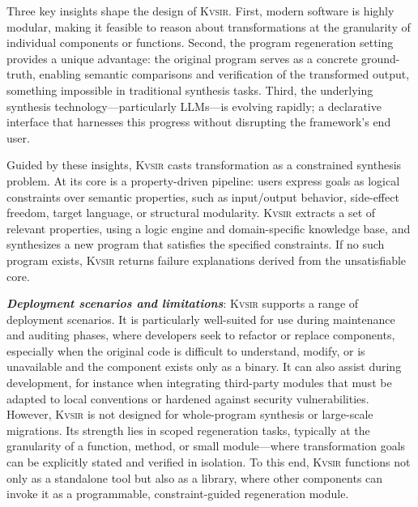 \documentclass[noacm,sigplan]{acmart}
\newcommand{\sys}{{\scshape Kv{\textalpha}sir}\xspace}
\newcommand{\heading}[1]{\vspace{2pt}\noindent\textbf{\emph{#1}}:\enspace}
\begin{document}
Three key insights shape the design of \sys.
First, modern software is highly modular, making it feasible to reason about transformations at the granularity of individual components or functions.
Second, the program regeneration setting provides a unique advantage: the original program serves as a concrete ground-truth, enabling semantic comparisons and verification of the transformed output, something impossible in traditional synthesis tasks.
Third, the underlying synthesis technology---particularly LLMs---is evolving rapidly; a declarative interface that harnesses this progress without disrupting the framework's end user.

Guided by these insights, \sys casts transformation as a constrained synthesis problem.
At its core is a property-driven pipeline: users express goals as logical constraints over semantic properties, such as input/output behavior, side-effect freedom, target language, or structural modularity.
\sys extracts a set of relevant properties, using a logic engine and domain-specific knowledge base, and synthesizes a new program that satisfies the specified constraints.
If no such program exists, \sys returns failure explanations derived from the unsatisfiable core.

\heading{Deployment scenarios and limitations}
\sys supports a range of deployment scenarios.
It is particularly well-suited for use during maintenance and auditing phases, where developers seek to refactor or replace components, especially when the original code is difficult to understand, modify, or is unavailable and the component exists only as a binary.
It can also assist during development, for instance when integrating third-party modules that must be adapted to local conventions or hardened against security vulnerabilities.
However, \sys is not designed for whole-program synthesis or large-scale migrations.
Its strength lies in scoped regeneration tasks, typically at the granularity of a function, method, or small module---where transformation goals can be explicitly stated and verified in isolation.
To this end, \sys functions not only as a standalone tool but also as a
library, where other components can invoke it as a programmable,
constraint-guided regeneration module.

\end{document}
